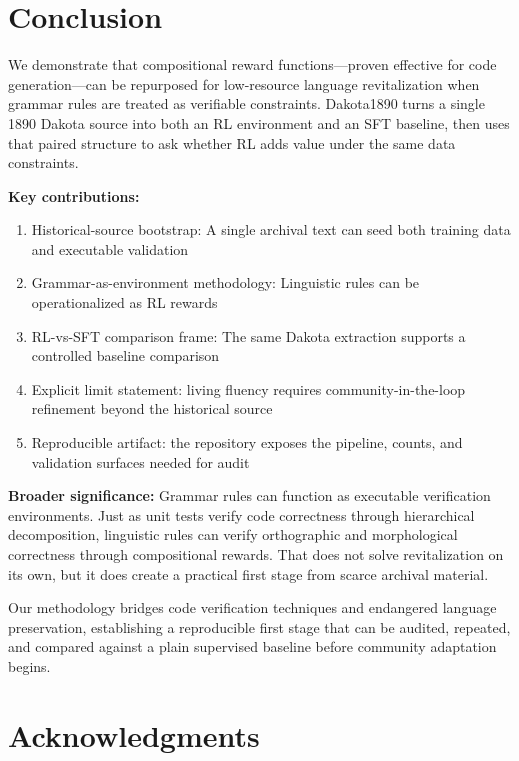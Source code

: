 \documentclass{article}
\begin{document}
\section{Conclusion}

We demonstrate that compositional reward functions---proven effective for code generation---can be repurposed for low-resource language revitalization when grammar rules are treated as verifiable constraints. Dakota1890 turns a single 1890 Dakota source into both an RL environment and an SFT baseline, then uses that paired structure to ask whether RL adds value under the same data constraints.

\textbf{Key contributions:}

\begin{enumerate}
    \item Historical-source bootstrap: A single archival text can seed both training data and executable validation
    \item Grammar-as-environment methodology: Linguistic rules can be operationalized as RL rewards
    \item RL-vs-SFT comparison frame: The same Dakota extraction supports a controlled baseline comparison
    \item Explicit limit statement: living fluency requires community-in-the-loop refinement beyond the historical source
    \item Reproducible artifact: the repository exposes the pipeline, counts, and validation surfaces needed for audit
\end{enumerate}

\textbf{Broader significance:} Grammar rules can function as executable verification environments. Just as unit tests verify code correctness through hierarchical decomposition, linguistic rules can verify orthographic and morphological correctness through compositional rewards. That does not solve revitalization on its own, but it does create a practical first stage from scarce archival material.

Our methodology bridges code verification techniques and endangered language preservation, establishing a reproducible first stage that can be audited, repeated, and compared against a plain supervised baseline before community adaptation begins.

\section*{Acknowledgments}
\end{document}

